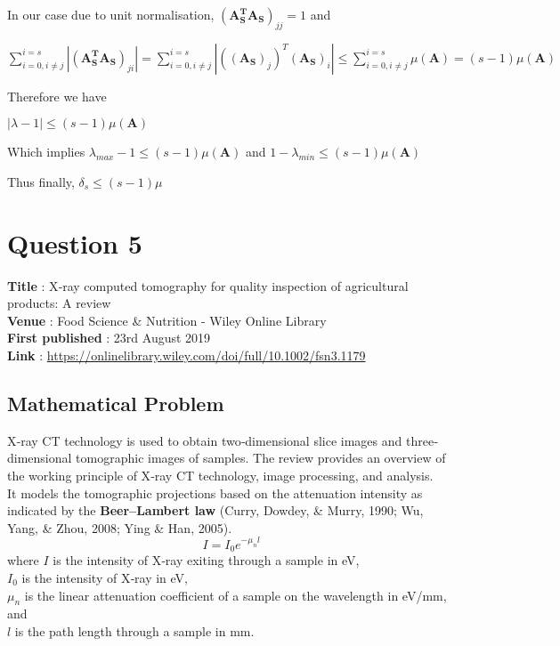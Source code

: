 \documentclass[fleqn, 11pt]{article}
\newcommand{\bs}[1]{\boldsymbol{#1}}
\begin{document}
In our case due to unit normalisation, $(\bs{A_S^TA_S})_{jj}=1$ and  

$\displaystyle \sum_{i=0, i \neq j}^{i=s} |(\bs{A_S^TA_S})_{ji} | 
= \sum_{i=0, i \neq j}^{i=s} |((\bs{A_S})_j)^T (\bs{A_S})_{i} |  
\leq \sum_{i=0, i \neq j}^{i=s} \mu(\bs{A}) 
= (s-1) \mu(\bs{A})   $

\medskip 

Therefore we have 

$|\lambda-1|  \leq  (s-1) \mu(\bs{A})  $

\medskip 

Which implies $\lambda_{max} -1  \leq  (s-1) \mu(\bs{A})  $ and $1-\lambda_{min}  \leq  (s-1) \mu(\bs{A})  $ 

\medskip 

Thus finally,
$\delta_s \leq (s-1) \mu $ 



\newpage
\section*{Question 5}
\setcounter{equation}{0}

\textbf{Title} : X‐ray computed tomography for quality inspection of agricultural products: A review \\
\textbf{Venue} : Food Science \& Nutrition - Wiley Online Library \\
\textbf{First published} : 23rd August 2019 \\
\textbf{Link} : \url{https://onlinelibrary.wiley.com/doi/full/10.1002/fsn3.1179} \\

\subsection*{Mathematical Problem}
X‐ray CT technology is used to obtain two‐dimensional slice images and three‐dimensional tomographic images of samples. The review provides an overview of the working principle of X‐ray CT technology, image processing, and analysis. \\

It models the tomographic projections based on the attenuation intensity as indicated by the \textbf{Beer–Lambert law} (Curry, Dowdey, \& Murry, 1990; Wu, Yang, \& Zhou, 2008; Ying \& Han, 2005).
$$I = I_0 e^{-\mu_n l}$$
where $I$ is the intensity of X‐ray exiting through a sample in eV,\\
$I_0$ is the intensity of X‐ray in eV,\\
$\mu_n$ is the linear attenuation coefficient of a sample on the wavelength in eV/mm, and\\
$l$ is the path length through a sample in mm. \\
\end{document}
